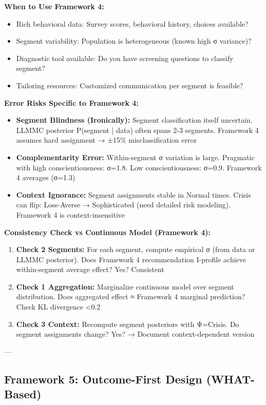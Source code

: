 \textbf{When to Use Framework 4:}
\begin{itemize}[nosep]
\item Rich behavioral data: Survey scores, behavioral history, choices available?
\item Segment variability: Population is heterogeneous (known high σ variance)?
\item Diagnostic tool available: Do you have screening questions to classify segment?
\item Tailoring resources: Customized communication per segment is feasible?
\end{itemize}

\textbf{Error Risks Specific to Framework 4:}
\begin{itemize}[nosep]
\item \textbf{Segment Blindness (Ironically):} Segment classification itself uncertain. LLMMC posterior P(segment | data) often spans 2-3 segments. Framework 4 assumes hard assignment → ±15\% misclassification error
\item \textbf{Complementarity Error:} Within-segment σ variation is large. Pragmatic with high conscientiousness: σ=1.8. Low conscientiousness: σ=0.9. Framework 4 averages (σ=1.3)
\item \textbf{Context Ignorance:} Segment assignments stable in Normal times. Crisis can flip: Loss-Averse → Sophisticated (need detailed risk modeling). Framework 4 is context-insensitive
\end{itemize}

\textbf{Consistency Check vs Continuous Model (Framework 4):}
\begin{enumerate}[nosep]
\item \textbf{Check 2 Segments:} For each segment, compute empirical σ (from data or LLMMC posterior). Does Framework 4 recommendation I-profile achieve within-segment average effect? Yes? Consistent
\item \textbf{Check 1 Aggregation:} Marginalize continuous model over segment distribution. Does aggregated effect ≈ Framework 4 marginal prediction? Check KL divergence <0.2
\item \textbf{Check 3 Context:} Recompute segment posteriors with Ψ=Crisis. Do segment assignments change? Yes? → Document context-dependent version
\end{enumerate}

---

\subsection{Framework 5: Outcome-First Design (WHAT-Based)}
\label{subsec:20-framework-5}

